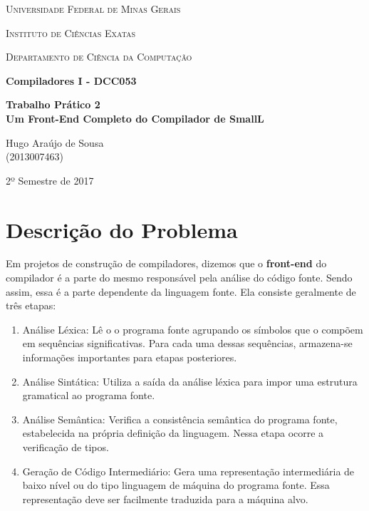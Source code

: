 \documentclass[a4paper,12pt]{report}
\begin{document}
\begin{titlepage}
	\centering
	{\scshape\LARGE Universidade Federal de Minas Gerais \par}
	{\scshape\Large Instituto de Ciências Exatas \par}
	{\scshape\Large Departamento de Ciência da Computação \par}
	\vfill
	{\huge\bfseries \textbf{Compiladores I - DCC053} \par}
	{\huge\bfseries \textbf{Trabalho Prático 2\\Um Front-End Completo do Compilador de SmallL} \par}
	\vfill
	{\Large Hugo Araújo de Sousa\\(2013007463)\par}
	\vfill
	{\large 2º Semestre de 2017\par}
\end{titlepage}

\newpage
\tableofcontents
\newpage

\section{Descrição do Problema}

Em projetos de construção de compiladores, dizemos que o \textbf{front-end} do compilador é
a parte do mesmo responsável pela análise do código fonte. Sendo assim, essa é a parte dependente
da linguagem fonte. Ela consiste geralmente de três etapas:

\begin{enumerate}
 \item Análise Léxica: Lê o o programa fonte agrupando os símbolos que o compõem em sequências significativas.
 Para cada uma dessas sequências, armazena-se informações importantes para etapas posteriores.
 
 \item Análise Sintática: Utiliza a saída da análise léxica para impor uma estrutura gramatical ao programa
 fonte. 
 
 \item Análise Semântica: Verifica a consistência semântica do programa fonte, estabelecida na própria definição
 da linguagem. Nessa etapa ocorre a verificação de tipos.
 
 \item Geração de Código Intermediário: Gera uma representação intermediária de baixo nível ou do tipo linguagem
 de máquina do programa fonte. Essa representação deve ser facilmente traduzida para a máquina alvo.
\end{enumerate}
\end{document}
